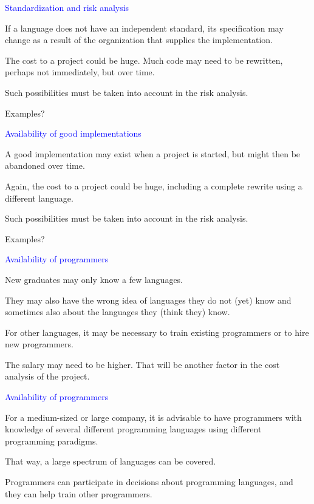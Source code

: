 \documentclass{slides}
\newcommand{\ti}[1]{\begin{center}\Large{\textcolor{blue}{#1}}\end{center}}
\begin{document}
\begin{slide}\ti{Standardization and risk analysis}

If a language does not have an independent standard, its specification
may change as a result of the organization that supplies the
implementation.

The cost to a project could be huge.  Much code may need to be
rewritten, perhaps not immediately, but over time.

Such possibilities must be taken into account in the risk analysis.

Examples?

\vfill\end{slide}
\begin{slide}\ti{Availability of good implementations}

A good implementation may exist when a project is started, but might
then be abandoned over time.

Again, the cost to a project could be huge, including a complete
rewrite using a different language.

Such possibilities must be taken into account in the risk analysis.

Examples?

\vfill\end{slide}
\begin{slide}\ti{Availability of programmers}

New graduates may only know a few languages.

They may also have the wrong idea of languages they do not (yet) know
and sometimes also about the languages they (think they) know.

For other languages, it may be necessary to train existing programmers
or to hire new programmers.

The salary may need to be higher.  That will be another factor in the
cost analysis of the project.

\vfill\end{slide}
\begin{slide}\ti{Availability of programmers}

For a medium-sized or large company, it is advisable to have
programmers with knowledge of several different programming languages
using different programming paradigms.

That way, a large spectrum of languages can be covered.

Programmers can participate in decisions about programming languages,
and they can help train other programmers.

\vfill\end{slide}
\end{document}
